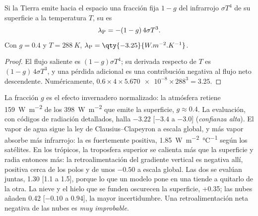 \begin{proposition}\label{prop:b2:anthropogenic-climate-change:planck}
Si la Tierra emite hacia el espacio una fracción fija $1 - g$ del infrarrojo $\sigma T^4$ de su superficie a la
temperatura $T$, su  es
\[
  \lambda_{\text P} = -(1 - g)\,4\sigma T^3 .
\]
Con $g = 0.4$ y $T = \qty{288}{K}$, $\lambda_{\text P} = \qty{-3.25}{W.m^{-2}.K^{-1}}$.
\end{proposition}
\begin{proof}
El flujo saliente es $(1 - g)\sigma T^4$; su derivada respecto de $T$ es $(1 - g)\,4\sigma
T^3$, y una pérdida adicional es una contribución negativa al flujo neto descendente. Numéricamente, $0.6
\times 4 \times \num{5.670e-8} \times 288^3 = 3.25$.
\end{proof}

La fracción $g$ es el efecto invernadero normalizado: la atmósfera retiene \qty{159}{W.m^{-2}} de
los \qty{398}{W.m^{-2}} que emite la superficie, $g \approx 0.4$. La evaluación, con códigos de radiación
detallados, halla $-3.22$ [$-3.4$ a $-3.0$] (\emph{confianza alta}). El vapor de agua sigue
la ley de Clausius--Clapeyron a escala global, y más vapor absorbe más infrarrojo: la
 es fuertemente positiva, \qty{1.85}{W.m^{-2}.\celsius^{-1}} según los satélites.
En los trópicos, la troposfera superior se calienta más que la superficie y radia entonces más: la
retroalimentación del gradiente vertical es negativa allí, positiva cerca de los polos y de unos $-0.50$ a escala global. Las dos
se evalúan juntas, \num{1.30} [1.1 a 1.5], porque lo que un modelo pone en una tiende a
quitarlo de la otra. La nieve y el hielo que se funden oscurecen la superficie, +0.35; las nubes añaden \num{0.42}
[$-0.10$ a $0.94$], la mayor incertidumbre. Una retroalimentación neta negativa de las nubes es \emph{muy improbable}.

